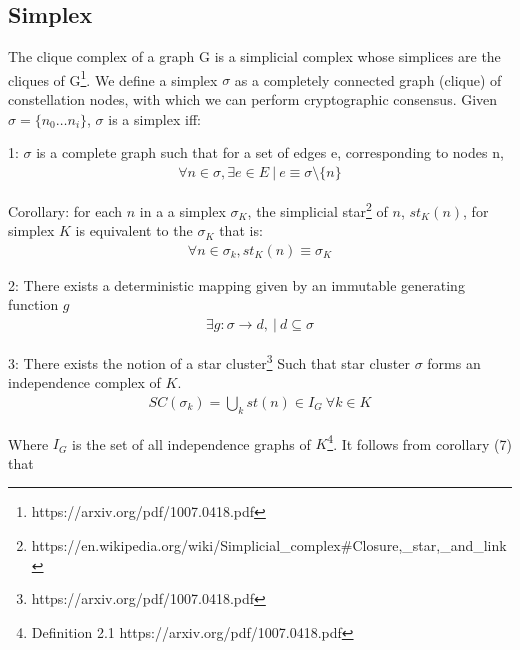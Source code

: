 \documentclass{article}
\begin{document}
\subsection{Simplex}
The clique complex of a graph G is a simplicial complex whose simplices are the cliques of G\footnote{https://arxiv.org/pdf/1007.0418.pdf}. We define a simplex $\sigma$ as a completely connected graph (clique) of constellation nodes, with which we can perform cryptographic consensus. Given $\sigma = \{n_0 \dots n_i\}$, $\sigma$ is a simplex iff:

1: $\sigma$ is a complete graph such that for a set of edges e, corresponding to nodes n,
\begin{equation} \label{eq1}
\begin{split}
\forall n \in \sigma, \exists e \in E \ | \ e \equiv \sigma \setminus \{n\} 
\end{split}
\end{equation}

Corollary: for each $n$ in a a simplex $\sigma_K$, the simplicial star\footnote{https://en.wikipedia.org/wiki/Simplicial_complex#Closure,_star,_and_link} of $n$, $st_K(n)$, for simplex $K$ is equivalent to the $\sigma_K$ that is:
\begin{equation} \label{eq1}
\begin{split}
\forall n \in \sigma_k, st_K(n) \equiv \sigma_K
\end{split}
\end{equation}

2: There exists a deterministic mapping given by an immutable generating function $g$
\begin{equation} \label{eq1}
\begin{split}
\exists g: \sigma \rightarrow d, \ | \ d \subseteq \sigma
\end{split}
\end{equation}

3: There exists the notion of a star cluster\footnote{https://arxiv.org/pdf/1007.0418.pdf} Such that star cluster $\sigma$ forms an independence complex of $K$.
\begin{equation} \label{eq1}
\begin{split}
SC(\sigma_k) = \bigcup_k st(n) \in I_G \ \forall k \in K
\end{split}
\end{equation}

Where $I_G$ is the set of all independence graphs of $K$\footnote{Definition 2.1 https://arxiv.org/pdf/1007.0418.pdf}. It follows from corollary (7) that
\end{document}
